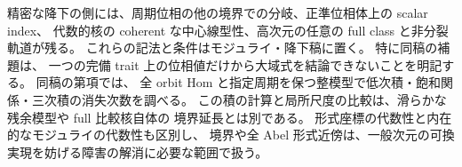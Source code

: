 精密な降下の側には、周期位相の他の境界での分岐、正準位相体上の scalar index、
代数的核の coherent な中心線型性、高次元の任意の full class と非分裂軌道が残る。
これらの記法と条件はモジュライ・降下稿に置く。
特に同稿の補題は、
一つの完備 trait 上の位相値だけから大域式を結論できないことを明記する。
同稿の第項では、
全 orbit Hom と指定周期を保つ整模型で低次積・飽和関係・三次積の消失次数を調べる。
この積の計算と局所尺度の比較は、滑らかな残余模型や full 比較核自体の
境界延長とは別である。
形式座標の代数性と内在的なモジュライの代数性も区別し、
境界や全 Abel 形式近傍は、一般次元の可換実現を妨げる障害の解消に必要な範囲で扱う。
